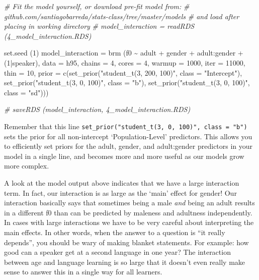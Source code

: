 \documentclass[
]{book}
\newenvironment{Shaded}{\begin{snugshade}}{\end{snugshade}}
\newcommand{\AttributeTok}[1]{\textcolor[rgb]{0.77,0.63,0.00}{#1}}
\newcommand{\CommentTok}[1]{\textcolor[rgb]{0.56,0.35,0.01}{\textit{#1}}}
\newcommand{\DecValTok}[1]{\textcolor[rgb]{0.00,0.00,0.81}{#1}}
\newcommand{\FunctionTok}[1]{\textcolor[rgb]{0.00,0.00,0.00}{#1}}
\newcommand{\NormalTok}[1]{#1}
\newcommand{\OtherTok}[1]{\textcolor[rgb]{0.56,0.35,0.01}{#1}}
\newcommand{\SpecialCharTok}[1]{\textcolor[rgb]{0.00,0.00,0.00}{#1}}
\newcommand{\StringTok}[1]{\textcolor[rgb]{0.31,0.60,0.02}{#1}}
\begin{document}
\begin{Shaded}
\begin{Highlighting}[]
\CommentTok{\# Fit the model yourself, or download pre{-}fit model from: }
\CommentTok{\# github.com/santiagobarreda/stats{-}class/tree/master/models}
\CommentTok{\# and load after placing in working directory}
\CommentTok{\#  model\_interaction = readRDS (\textquotesingle{}4\_model\_interaction.RDS\textquotesingle{})}

\FunctionTok{set.seed}\NormalTok{ (}\DecValTok{1}\NormalTok{)}
\NormalTok{model\_interaction }\OtherTok{=}  
  \FunctionTok{brm}\NormalTok{ (f0 }\SpecialCharTok{\textasciitilde{}}\NormalTok{ adult }\SpecialCharTok{+}\NormalTok{ gender }\SpecialCharTok{+}\NormalTok{ adult}\SpecialCharTok{:}\NormalTok{gender }\SpecialCharTok{+}\NormalTok{ (}\DecValTok{1}\SpecialCharTok{|}\NormalTok{speaker), }\AttributeTok{data =}\NormalTok{ h95, }
       \AttributeTok{chains =} \DecValTok{4}\NormalTok{, }\AttributeTok{cores =} \DecValTok{4}\NormalTok{, }\AttributeTok{warmup =} \DecValTok{1000}\NormalTok{, }\AttributeTok{iter =} \DecValTok{11000}\NormalTok{, }\AttributeTok{thin =} \DecValTok{10}\NormalTok{, }
       \AttributeTok{prior =} \FunctionTok{c}\NormalTok{(}\FunctionTok{set\_prior}\NormalTok{(}\StringTok{"student\_t(3, 200, 100)"}\NormalTok{, }\AttributeTok{class =} \StringTok{"Intercept"}\NormalTok{),}
                              \FunctionTok{set\_prior}\NormalTok{(}\StringTok{"student\_t(3, 0, 100)"}\NormalTok{, }\AttributeTok{class =} \StringTok{"b"}\NormalTok{),}
                              \FunctionTok{set\_prior}\NormalTok{(}\StringTok{"student\_t(3, 0, 100)"}\NormalTok{, }\AttributeTok{class =} \StringTok{"sd"}\NormalTok{))) }

\CommentTok{\#  saveRDS (model\_interaction, \textquotesingle{}4\_model\_interaction.RDS\textquotesingle{})}
\end{Highlighting}
\end{Shaded}

Remember that this line \texttt{set\_prior("student\_t(3,\ 0,\ 100)",\ class\ =\ "b")} sets the prior for all non-intercept `Population-Level' predictors. This allows you to efficiently set priors for the adult, gender, and adult:gender predictors in your model in a single line, and becomes more and more useful as our models grow more complex.

A look at the model output above indicates that we have a large interaction term. In fact, our interaction is as large as the `main' effect for gender! Our interaction basically says that sometimes being a male \emph{and} being an adult results in a different f0 than can be predicted by maleness and adultness independently. In cases with large interactions we have to be very careful about interpreting the main effects. In other words, when the answer to a question is ``it really depends'', you should be wary of making blanket statements. For example: how good can a speaker get at a second language in one year? The interaction between age and language learning is so large that it doesn't even really make sense to answer this in a single way for all learners.
\end{document}
